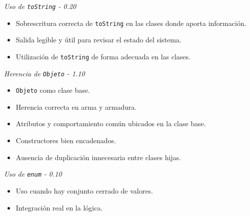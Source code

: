 \documentclass[10pt,a4paper]{article}
\newcommand{\subbloque}[2]{\textit{#1 - #2}\par}
\begin{document}
\subbloque{Uso de \texttt{toString}}{0.20}
\begin{itemize}
    \item Sobrescritura correcta de \texttt{toString} en las clases donde aporta información.
    \item Salida legible y útil para revisar el estado del sistema.
    \item Utilización de \texttt{toString} de forma adecuada en las clases.
\end{itemize}
\subbloque{Herencia de \texttt{Objeto}}{1.10}
\begin{itemize}
    \item \texttt{Objeto} como clase base.
    \item Herencia correcta en arma y armadura.
    \item Atributos y comportamiento común ubicados en la clase base.
    \item Constructores bien encadenados.
    \item Ausencia de duplicación innecesaria entre clases hijas.
\end{itemize}
\subbloque{Uso de \texttt{enum}}{0.10}
\begin{itemize}
    \item Uso cuando hay conjunto cerrado de valores.
    \item Integración real en la lógica.
\end{itemize}
\end{document}
